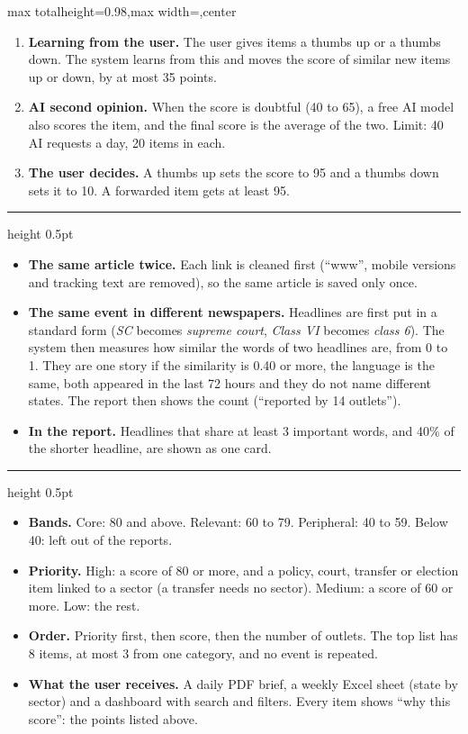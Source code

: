 \documentclass[10pt,a4paper]{article}
\newcommand{\stage}[2]{\vspace{7pt}{\large\bfseries Stage #1.\enspace #2}\par\nobreak\vspace{1pt}%
  \hrule height 0.5pt\nobreak\vspace{3pt}}
\newcommand{\kw}[1]{\textit{#1}}
\newcommand{\lbl}[1]{\textbf{#1}}
\begin{document}
\begin{adjustbox}{max totalheight=0.98\textheight,max width=\textwidth,center}
\begin{minipage}{\textwidth}
\begin{enumerate}
  \item \lbl{Learning from the user.} The user gives items a thumbs up or a thumbs down. The system learns from this and moves the score of similar new items up or down, by at most 35 points.
  \item \lbl{AI second opinion.} When the score is doubtful (40 to 65), a free AI model also scores the item, and the final score is the average of the two. Limit: 40 AI requests a day, 20 items in each.
  \item \lbl{The user decides.} A thumbs up sets the score to 95 and a thumbs down sets it to 10. A forwarded item gets at least 95.
\end{enumerate}

\stage{4}{Removing duplicates}

\begin{itemize}
  \item \lbl{The same article twice.} Each link is cleaned first (``www'', mobile versions and tracking text are removed), so the same article is saved only once.
  \item \lbl{The same event in different newspapers.} Headlines are first put in a standard form (\kw{SC} becomes \kw{supreme court}, \kw{Class VI} becomes \kw{class 6}). The system then measures how similar the words of two headlines are, from 0 to 1. They are one story if the similarity is 0.40 or more, the language is the same, both appeared in the last 72 hours and they do not name different states. The report then shows the count (``reported by 14 outlets'').
  \item \lbl{In the report.} Headlines that share at least 3 important words, and 40\% of the shorter headline, are shown as one card.
\end{itemize}

\stage{5}{Ranking and reporting}

\begin{itemize}
  \item \lbl{Bands.} Core: 80 and above. Relevant: 60 to 79. Peripheral: 40 to 59. Below 40: left out of the reports.
  \item \lbl{Priority.} High: a score of 80 or more, and a policy, court, transfer or election item linked to a sector (a transfer needs no sector). Medium: a score of 60 or more. Low: the rest.
  \item \lbl{Order.} Priority first, then score, then the number of outlets. The top list has 8 items, at most 3 from one category, and no event is repeated.
  \item \lbl{What the user receives.} A daily PDF brief, a weekly Excel sheet (state by sector) and a dashboard with search and filters. Every item shows ``why this score'': the points listed above.
\end{itemize}

\end{minipage}
\end{adjustbox}
\end{document}
